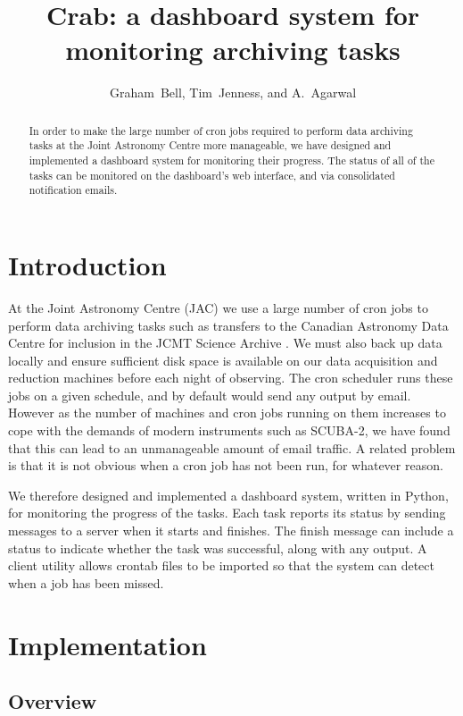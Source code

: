 \documentclass[11pt,twoside]{article}
\begin{document}
\title{Crab: a dashboard system for monitoring archiving tasks}
\author{Graham~Bell, Tim~Jenness, and A.~Agarwal
}

\begin{abstract}
In order to make the large number of cron jobs
required to perform data archiving tasks
at the Joint Astronomy Centre more manageable,
we have designed and implemented a dashboard system
for monitoring their progress. 
The status of all of the tasks can be monitored on the dashboard's
web interface, and via consolidated notification emails.
\end{abstract}

\section{Introduction}
At the Joint Astronomy Centre (JAC)
we use a large number of cron jobs to
perform data archiving tasks such as transfers to
the Canadian Astronomy Data Centre
for inclusion in the JCMT Science Archive
\citep{2011ASPC..442..203E}.
We must also back up data locally and
ensure sufficient disk space is available
on our data acquisition and reduction machines
before each night of observing.
The cron scheduler runs these
jobs on a given schedule, and by default would send any output by email.
However as the number of machines and cron jobs
running on them increases to cope with
the demands of modern instruments such as SCUBA-2,
we have found that this can lead to an
unmanageable amount of email traffic.
A related problem is that it is
not obvious when a cron job has not been run, for whatever reason.

We therefore designed and implemented a dashboard system,
written in Python,
for monitoring the progress of the tasks. 
Each task reports its status by sending messages
to a server when it starts and finishes.
The finish message can include a status to indicate whether the task
was successful, along with any output.  
A client utility allows crontab files
to be imported so that the system can detect when a job has been missed.


\section{Implementation}

\subsection{Overview}
\end{document}
